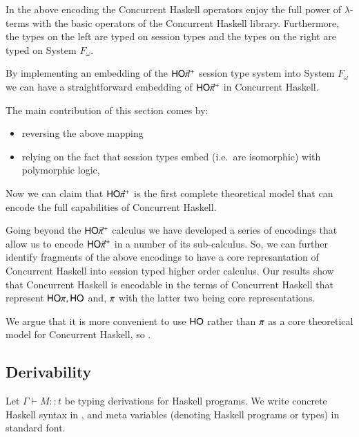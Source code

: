 In the above encoding the Concurrent Haskell operators enjoy the full power
of $\lambda$-terms with the basic operators of the Concurrent Haskell library.
Furthermore, the types on the left are typed on session types and the
types on the right are typed on System $F_\omega$.

By implementing an embedding of the $\mathsf{HO}{\vec{\pi}}^{+}$ session type system into 
System $F_\omega$ we can have a straightforward embedding of $\mathsf{HO}{\vec{\pi}}^{+}$
in Concurrent Haskell.


The main contribution of this section comes by:
\begin{itemize}
	\item	reversing the above mapping
	\item	relying on the fact that session types embed (i.e.~are isomorphic) with polymorphic logic, \cite{DBLP:conf/esop/CairesPPT13}
\end{itemize}

Now we can claim that $\mathsf{HO}{\vec{\pi}}^{+}$ is the first complete
theoretical model that can encode the full capabilities of Concurrent
Haskell.

Going beyond the $\mathsf{HO}{\vec{\pi}}^{+}$ calculus we have developed a series
of encodings that allow us to encode $\mathsf{HO}{\vec{\pi}}^{+}$ in a number
of its sub-calculus. So, we can further identify fragments of
the above encodings to have a core represantation of Concurrent
Haskell into session typed higher order calculus.
Our results show that Concurrent Haskell is encodable
in the terms of Concurrent Haskell that represent
$\mathsf{HO}\pi, \mathsf{HO}$ and, $\pi$ with the latter two being
core representations.

We argue that it is more convenient to use $\mathsf{HO}$ rather
than $\pi$ as a core theoretical model for Concurrent Haskell,
so .


\subsection{Derivability}

Let $\Gamma \vdash M :: t$ be typing derivations for Haskell programs. We write concrete
Haskell syntax in , and meta variables (denoting Haskell programs or types)
in standard font. 

